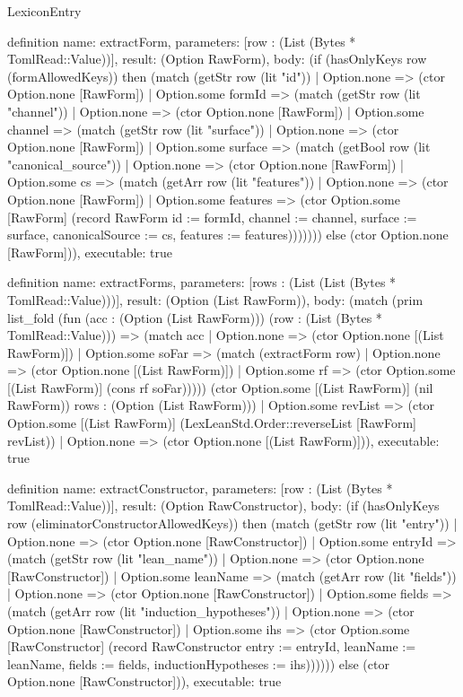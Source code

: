 \begin{lexlean}{LexiconEntry}
\begin{semanticmodule}
definition{
  name: extractForm,
  parameters: [row : (List (Bytes * TomlRead::Value))],
  result: (Option RawForm),
  body: (if (hasOnlyKeys row (formAllowedKeys)) then (match (getStr row (lit "id"))
    | Option.none => (ctor Option.none [RawForm])
    | Option.some formId => (match (getStr row (lit "channel"))
      | Option.none => (ctor Option.none [RawForm])
      | Option.some channel => (match (getStr row (lit "surface"))
        | Option.none => (ctor Option.none [RawForm])
        | Option.some surface => (match (getBool row (lit "canonical_source"))
          | Option.none => (ctor Option.none [RawForm])
          | Option.some cs => (match (getArr row (lit "features"))
            | Option.none => (ctor Option.none [RawForm])
            | Option.some features => (ctor Option.some [RawForm] (record RawForm {id := formId, channel := channel, surface := surface, canonicalSource := cs, features := features}))))))) else (ctor Option.none [RawForm])),
  executable: true
}

definition{
  name: extractForms,
  parameters: [rows : (List (List (Bytes * TomlRead::Value)))],
  result: (Option (List RawForm)),
  body: (match (prim list_fold (fun (acc : (Option (List RawForm))) (row : (List (Bytes * TomlRead::Value))) => (match acc
      | Option.none => (ctor Option.none [(List RawForm)])
      | Option.some soFar => (match (extractForm row)
        | Option.none => (ctor Option.none [(List RawForm)])
        | Option.some rf => (ctor Option.some [(List RawForm)] (cons rf soFar))))) (ctor Option.some [(List RawForm)] (nil RawForm)) rows : (Option (List RawForm)))
    | Option.some revList => (ctor Option.some [(List RawForm)] (LexLeanStd.Order::reverseList [RawForm] revList))
    | Option.none => (ctor Option.none [(List RawForm)])),
  executable: true
}

definition{
  name: extractConstructor,
  parameters: [row : (List (Bytes * TomlRead::Value))],
  result: (Option RawConstructor),
  body: (if (hasOnlyKeys row (eliminatorConstructorAllowedKeys)) then (match (getStr row (lit "entry"))
    | Option.none => (ctor Option.none [RawConstructor])
    | Option.some entryId => (match (getStr row (lit "lean_name"))
      | Option.none => (ctor Option.none [RawConstructor])
      | Option.some leanName => (match (getArr row (lit "fields"))
        | Option.none => (ctor Option.none [RawConstructor])
        | Option.some fields => (match (getArr row (lit "induction_hypotheses"))
          | Option.none => (ctor Option.none [RawConstructor])
          | Option.some ihs => (ctor Option.some [RawConstructor] (record RawConstructor {entry := entryId, leanName := leanName, fields := fields, inductionHypotheses := ihs})))))) else (ctor Option.none [RawConstructor])),
  executable: true
}


\end{semanticmodule}
\end{lexlean}
